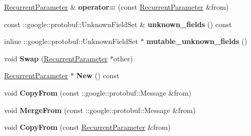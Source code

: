 \begin{DoxyCompactItemize}
\item 
\mbox{\label{classcaffe_1_1_recurrent_parameter_a4f241f7a1fe9f34ccd24355168c05b36}} 
\mbox{\hyperlink{classcaffe_1_1_recurrent_parameter}{Recurrent\+Parameter}} \& {\bfseries operator=} (const \mbox{\hyperlink{classcaffe_1_1_recurrent_parameter}{Recurrent\+Parameter}} \&from)
\item 
\mbox{\label{classcaffe_1_1_recurrent_parameter_a29fa7393bd7d0d4950e0d20d2451b1ea}} 
const \+::google\+::protobuf\+::\+Unknown\+Field\+Set \& {\bfseries unknown\+\_\+fields} () const
\item 
\mbox{\label{classcaffe_1_1_recurrent_parameter_ad8f9fae04ed75816d696d7a6a1dc0479}} 
inline \+::google\+::protobuf\+::\+Unknown\+Field\+Set $\ast$ {\bfseries mutable\+\_\+unknown\+\_\+fields} ()
\item 
\mbox{\label{classcaffe_1_1_recurrent_parameter_a34b79459e762ff616f60258c3c7c07d0}} 
void {\bfseries Swap} (\mbox{\hyperlink{classcaffe_1_1_recurrent_parameter}{Recurrent\+Parameter}} $\ast$other)
\item 
\mbox{\label{classcaffe_1_1_recurrent_parameter_a9b90ba94eaa6dcae062bf77f0b13b2ea}} 
\mbox{\hyperlink{classcaffe_1_1_recurrent_parameter}{Recurrent\+Parameter}} $\ast$ {\bfseries New} () const
\item 
\mbox{\label{classcaffe_1_1_recurrent_parameter_a5ad4ab75b74f5475496dcab8268b07c6}} 
void {\bfseries Copy\+From} (const \+::google\+::protobuf\+::\+Message \&from)
\item 
\mbox{\label{classcaffe_1_1_recurrent_parameter_aec8837cb599c1fe34c8b465d7de036f9}} 
void {\bfseries Merge\+From} (const \+::google\+::protobuf\+::\+Message \&from)
\item 
\mbox{\label{classcaffe_1_1_recurrent_parameter_a52dcb4ecb5e1e9ab58709289f9f37b30}} 
void {\bfseries Copy\+From} (const \mbox{\hyperlink{classcaffe_1_1_recurrent_parameter}{Recurrent\+Parameter}} \&from)

\end{DoxyCompactItemize}
